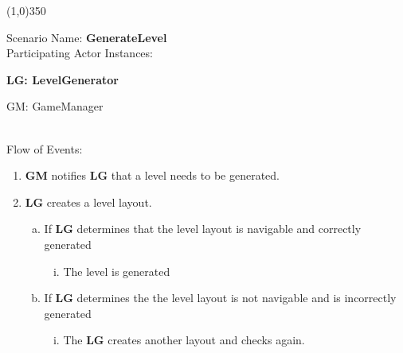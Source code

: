 \documentclass[12pt]{article}       %
\begin{document}
\begin{center} \line(1,0){350} \end{center}
Scenario Name: {\bf GenerateLevel} \\
Participating Actor Instances:        \hspace{46pt} {\bf LG: LevelGenerator

					          \hspace{2.6 in}   GM: GameManager}  \vspace{10pt}  \\ 
Flow of Events: 
\begin{enumerate} 
\item {\bf GM} notifies {\bf LG} that a level needs to be generated.
\item {\bf LG} creates a level layout.
      \begin{enumerate}[a.]
      \item If {\bf LG} determines that the level layout is navigable and correctly generated
                \begin{enumerate}[i.]
                \item The level is generated
                \end{enumerate}
      \item If {\bf LG} determines the the level layout is not navigable and is incorrectly generated
                \begin{enumerate}[i.]
                \item The {\bf LG} creates another layout and checks again.
                \end{enumerate}
        \end{enumerate}
\end{enumerate}
\end{document}
